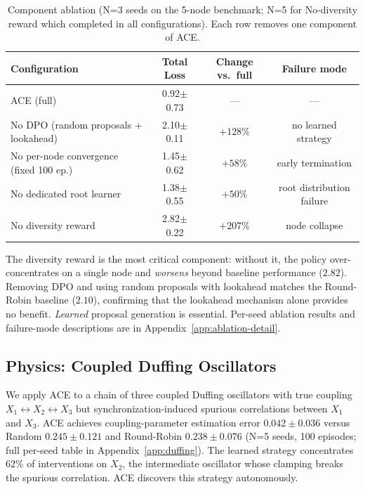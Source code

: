 \documentclass{article}
\theoremstyle{plain}
\theoremstyle{definition}
\theoremstyle{remark}
\begin{document}
\begin{table}[t]
\centering
\caption{Component ablation (N=3 seeds on the 5-node benchmark; N=5 for No-diversity reward which completed in all configurations). Each row removes one component of ACE.}
\label{tab:ablations}
\small
\begin{tabular}{@{}lccc@{}}
\toprule
Configuration & Total Loss & Change vs.\ full & Failure mode \\
\midrule
ACE (full) & 0.92$\pm$0.73 & --- & --- \\
\midrule
No DPO (random proposals + lookahead) & 2.10$\pm$0.11 & $+128\%$ & no learned strategy \\
No per-node convergence (fixed 100 ep.) & 1.45$\pm$0.62 & $+58\%$ & early termination \\
No dedicated root learner & 1.38$\pm$0.55 & $+50\%$ & root distribution failure \\
No diversity reward & 2.82$\pm$0.22 & $+207\%$ & node collapse \\
\bottomrule
\end{tabular}
\end{table}

The diversity reward is the most critical component: without it, the policy over-concentrates on a single node and \emph{worsens} beyond baseline performance ($2.82$). Removing DPO and using random proposals with lookahead matches the Round-Robin baseline ($2.10$), confirming that the lookahead mechanism alone provides no benefit. \emph{Learned} proposal generation is essential. Per-seed ablation results and failure-mode descriptions are in Appendix~\ref{app:ablation-detail}.

\subsection{Physics: Coupled Duffing Oscillators}
\label{sec:results-duffing}

We apply ACE to a chain of three coupled Duffing oscillators \citep{kovacic2011duffing} with true coupling $X_1 \leftrightarrow X_2 \leftrightarrow X_3$ but synchronization-induced spurious correlations between $X_1$ and $X_3$. ACE achieves coupling-parameter estimation error $0.042\pm0.036$ versus Random $0.245\pm0.121$ and Round-Robin $0.238\pm0.076$ (N=5 seeds, 100 episodes; full per-seed table in Appendix~\ref{app:duffing}). The learned strategy concentrates $62\%$ of interventions on $X_2$, the intermediate oscillator whose clamping breaks the spurious correlation. ACE discovers this strategy autonomously.
\end{document}
